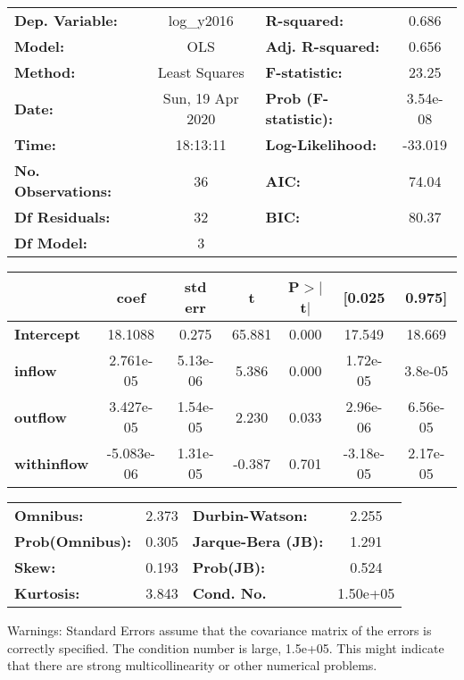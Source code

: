 \begin{center}
\begin{tabular}{lclc}
\toprule
\textbf{Dep. Variable:}    &    log\_y2016    & \textbf{  R-squared:         } &     0.686   \\
\textbf{Model:}            &       OLS        & \textbf{  Adj. R-squared:    } &     0.656   \\
\textbf{Method:}           &  Least Squares   & \textbf{  F-statistic:       } &     23.25   \\
\textbf{Date:}             & Sun, 19 Apr 2020 & \textbf{  Prob (F-statistic):} &  3.54e-08   \\
\textbf{Time:}             &     18:13:11     & \textbf{  Log-Likelihood:    } &   -33.019   \\
\textbf{No. Observations:} &          36      & \textbf{  AIC:               } &     74.04   \\
\textbf{Df Residuals:}     &          32      & \textbf{  BIC:               } &     80.37   \\
\textbf{Df Model:}         &           3      & \textbf{                     } &             \\
\bottomrule
\end{tabular}
\begin{tabular}{lcccccc}
                    & \textbf{coef} & \textbf{std err} & \textbf{t} & \textbf{P$> |$t$|$} & \textbf{[0.025} & \textbf{0.975]}  \\
\midrule
\textbf{Intercept}  &      18.1088  &        0.275     &    65.881  &         0.000        &       17.549    &       18.669     \\
\textbf{inflow}     &    2.761e-05  &     5.13e-06     &     5.386  &         0.000        &     1.72e-05    &      3.8e-05     \\
\textbf{outflow}    &    3.427e-05  &     1.54e-05     &     2.230  &         0.033        &     2.96e-06    &     6.56e-05     \\
\textbf{withinflow} &   -5.083e-06  &     1.31e-05     &    -0.387  &         0.701        &    -3.18e-05    &     2.17e-05     \\
\bottomrule
\end{tabular}
\begin{tabular}{lclc}
\textbf{Omnibus:}       &  2.373 & \textbf{  Durbin-Watson:     } &    2.255  \\
\textbf{Prob(Omnibus):} &  0.305 & \textbf{  Jarque-Bera (JB):  } &    1.291  \\
\textbf{Skew:}          &  0.193 & \textbf{  Prob(JB):          } &    0.524  \\
\textbf{Kurtosis:}      &  3.843 & \textbf{  Cond. No.          } & 1.50e+05  \\
\bottomrule
\end{tabular}
\end{center}

Warnings: \newline
 [1] Standard Errors assume that the covariance matrix of the errors is correctly specified. \newline
 [2] The condition number is large, 1.5e+05. This might indicate that there are \newline
 strong multicollinearity or other numerical problems.